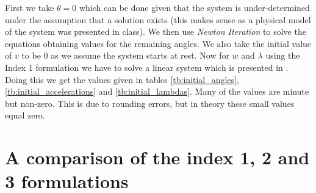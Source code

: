 \documentclass{report}
\begin{document}
First we take $\theta=0$ which can be done given that the system is under-determined under the assumption that a solution exists (this makes sense as a physical model of the system was presented in class). We then use \textit{Newton Iteration} to solve the equations obtaining values for the remaining angles.
We also take the initial value of $v$ to be $0$ as we assume the system starts at rest. Now for $w$ and $\lambda$ using the Index 1 formulation we have to solve a linear system which is presented in \cite{HW_SolvingODEs}. Doing this we get the values given in tables  \ref{tb:initial_angles}, \ref{tb:initial_accelerations} and \ref{tb:initial_lambdas}.
Many of the values are minute but non-zero. This is due to rounding errors, but in theory these small values equal zero.

\section*{A comparison of the index 1, 2 and 3 formulations}
\end{document}
